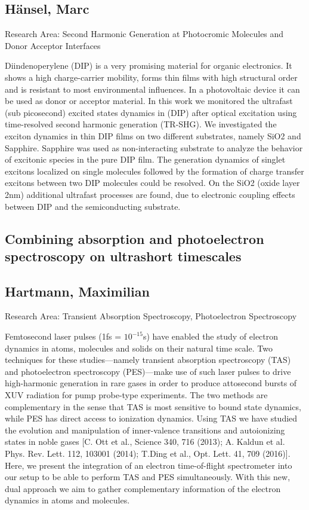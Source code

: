 \subsection*{\centering \normalsize H\"ansel, Marc}
Research Area: Second Harmonic Generation at Photocromic Molecules and Donor Acceptor Interfaces\newline

\noindent Diindenoperylene (DIP) is a very promising material for organic electronics. It shows a high charge-carrier mobility, forms thin films with high structural order and is resistant to most environmental influences. In a photovoltaic device it can be used as donor or acceptor material. In this work we monitored the ultrafast (sub picosecond) excited states dynamics in (DIP) after optical excitation using time-resolved second harmonic generation (TR-SHG). We investigated the exciton dynamics in thin DIP films on two different substrates, namely SiO2 and Sapphire. Sapphire was used as non-interacting substrate to analyze the behavior of excitonic species in the pure DIP film. The generation dynamics of singlet excitons localized on single molecules followed by the formation of charge transfer excitons between two DIP molecules could be resolved. On the SiO2 (oxide layer 2nm) additional ultrafast processes are found, due to electronic coupling effects between DIP and the semiconducting substrate.
\newpage

\subsection*{\centering \large Combining absorption and photoelectron spectroscopy on ultrashort timescales}
\subsection*{\centering \normalsize Hartmann, Maximilian}
Research Area: Transient Absorption Spectroscopy, Photoelectron Spectroscopy\newline

\noindent Femtosecond laser pulses (1fs = $10^{-15}$s) have enabled the study of electron dynamics in atoms, molecules and solids on their natural time scale. \newline
Two techniques for these studies---namely transient absorption spectroscopy (TAS) and photoelectron spectroscopy (PES)---make use of such laser pulses to drive high-harmonic generation in rare gases in order to produce attosecond bursts of XUV radiation for pump probe-type experiments. The two methods are complementary in the sense that TAS is most sensitive to bound state dynamics, while PES has direct access to ionization dynamics.\newline
Using TAS we have studied the evolution and manipulation of inner-valence transitions and autoionizing states in noble gases [C. Ott et al., Science 340, 716 (2013); A. Kaldun et al. Phys. Rev. Lett. 112, 103001 (2014); T.Ding et al., Opt. Lett. 41, 709 (2016)]. Here, we present the integration of an electron time-of-flight spectrometer into our setup to be able to perform TAS and PES simultaneously. With this new, dual approach we aim to gather complementary information of the electron dynamics in atoms and molecules.


